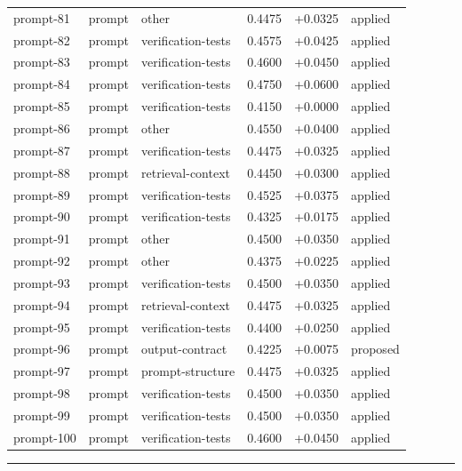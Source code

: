 \begin{center}
\begin{longtable}{llp{5.2cm}rrl}
prompt-81 & prompt & other & 0.4475 & +0.0325 & applied \\
prompt-82 & prompt & verification-tests & 0.4575 & +0.0425 & applied \\
prompt-83 & prompt & verification-tests & 0.4600 & +0.0450 & applied \\
prompt-84 & prompt & verification-tests & 0.4750 & +0.0600 & applied \\
prompt-85 & prompt & verification-tests & 0.4150 & +0.0000 & applied \\
prompt-86 & prompt & other & 0.4550 & +0.0400 & applied \\
prompt-87 & prompt & verification-tests & 0.4475 & +0.0325 & applied \\
prompt-88 & prompt & retrieval-context & 0.4450 & +0.0300 & applied \\
prompt-89 & prompt & verification-tests & 0.4525 & +0.0375 & applied \\
prompt-90 & prompt & verification-tests & 0.4325 & +0.0175 & applied \\
prompt-91 & prompt & other & 0.4500 & +0.0350 & applied \\
prompt-92 & prompt & other & 0.4375 & +0.0225 & applied \\
prompt-93 & prompt & verification-tests & 0.4500 & +0.0350 & applied \\
prompt-94 & prompt & retrieval-context & 0.4475 & +0.0325 & applied \\
prompt-95 & prompt & verification-tests & 0.4400 & +0.0250 & applied \\
prompt-96 & prompt & output-contract & 0.4225 & +0.0075 & proposed \\
prompt-97 & prompt & prompt-structure & 0.4475 & +0.0325 & applied \\
prompt-98 & prompt & verification-tests & 0.4500 & +0.0350 & applied \\
prompt-99 & prompt & verification-tests & 0.4500 & +0.0350 & applied \\
prompt-100 & prompt & verification-tests & 0.4600 & +0.0450 & applied \\
\bottomrule\end{longtable}\end{center}
\par\bigskip\hrule\bigskip
